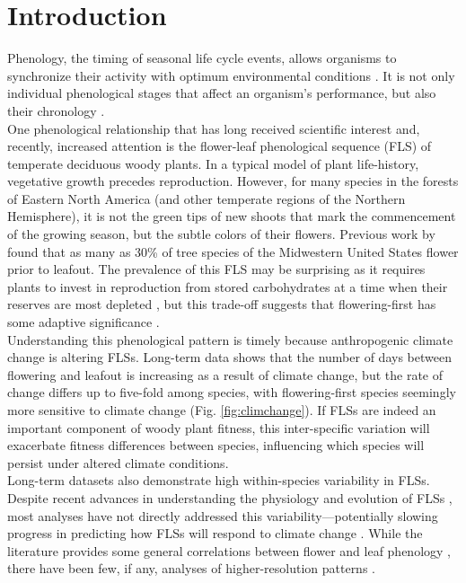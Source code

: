 \documentclass[11pt]{article}
\begin{document}
\section*{Introduction}
Phenology, the timing of seasonal life cycle events, allows organisms to synchronize their activity with optimum environmental conditions \citep{Forrest2010}. It is not only individual phenological stages that affect an organism's performance, but also their chronology \citep{Firmat2017,Vitasse2010,Ettinger2018}.\\

\noindent One phenological relationship that has long received scientific interest \citep[see][]{Robertson1895} and, recently, increased attention \citep[e.g.][]{Savage2019, Gougherty2018} is the flower-leaf phenological sequence (FLS) of temperate deciduous woody plants. In a typical model of plant life-history, vegetative growth precedes reproduction. However, for many species in the forests of Eastern North America (and other temperate regions of the Northern Hemisphere), it is not the green tips of new shoots that mark the commencement of the growing season, but the subtle colors of their flowers. Previous work by \citet{Gougherty2018} found that as many as 30\% of tree species of the Midwestern United States flower prior to leafout. The prevalence of this FLS may be surprising as it requires plants to invest in reproduction from stored carbohydrates at a time when their reserves are most depleted \citep{Primack1987}, but this trade-off suggests that flowering-first has some adaptive significance \citep{Rathcke_1985}.\\

\noindent Understanding this phenological pattern is timely because anthropogenic climate change is altering FLSs. Long-term data shows that the number of days between flowering and leafout is increasing as a result of climate change, but the rate of change differs up to five-fold among species, with flowering-first species seemingly more sensitive  to climate change (Fig. \ref{fig:climchange}). If FLSs are indeed an important component of woody plant fitness, this inter-specific variation will exacerbate fitness differences between species, influencing which species will persist under altered climate conditions.\\ 

\noindent Long-term datasets also demonstrate high within-species variability in FLSs. Despite recent advances in understanding the physiology and evolution of FLSs \citep{Gougherty2018,Savage2019}, most analyses have not directly addressed this variability---potentially slowing progress in predicting how FLSs will respond to climate change . While the literature provides some general correlations between flower and leaf phenology \citep[e.g.][]{Lechowicz_1995, Ettinger2018}, there have been few, if any, analyses of higher-resolution patterns \citep{Gougherty2018}. \\
\end{document}
